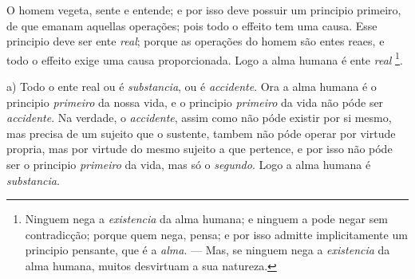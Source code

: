 
 
O homem vegeta, sente e entende; e por isso deve possuir um principio primeiro, de que emanam aquellas operações; pois todo o effeito tem uma causa. Esse principio deve ser ente \emph{real}; porque as operações do homem são entes reaes, e todo o effeito exige uma causa proporcionada. Logo a alma humana é ente \emph{real} \footnote{Ninguem nega a \emph{existencia} da alma humana; e ninguem a pode negar sem contradicção; porque quem nega, pensa; e por isso admitte implicitamente um principio pensante, que é a \emph{alma}. --- Mas, se ninguem nega a \emph{existencia} da alma humana, muitos desvirtuam a sua natureza.}.



a) Todo o ente real ou é \emph{substancia}, ou é \emph{accidente}. Ora a alma humana é o principio \emph{primeiro} da nossa vida, e o principio \emph{primeiro} da vida não póde ser \emph{accidente}. Na verdade, o \emph{accidente}, assim como não póde existir por si mesmo, mas precisa de um sujeito que o sustente, tambem não póde operar por virtude propria, mas por virtude do mesmo sujeito a que pertence, e por isso não póde ser o principio \emph{primeiro} da vida, mas só o \emph{segundo}. Logo a alma humana é \emph{substancia}.

